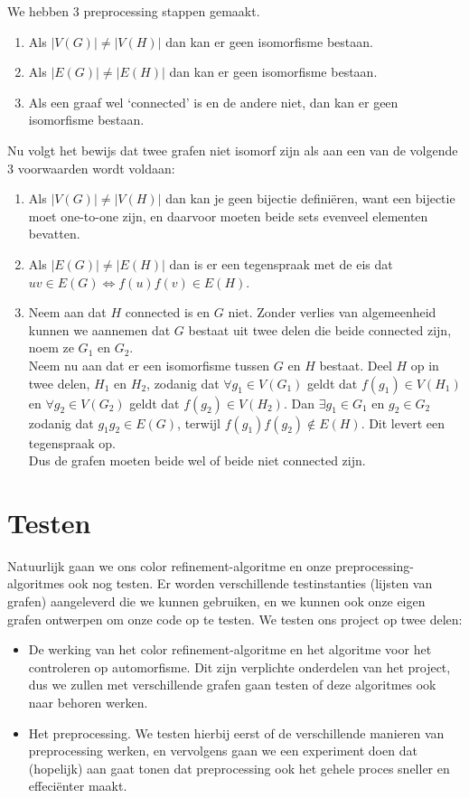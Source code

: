\documentclass{article}
\begin{document}
We hebben 3 preprocessing stappen gemaakt.
\begin{enumerate}
\item Als $|V(G)|\neq|V(H)|$ dan kan er geen isomorfisme bestaan.
\item Als $|E(G)|\neq|E(H)|$ dan kan er geen isomorfisme bestaan.
\item Als een graaf wel `connected' is en de andere niet, dan kan er geen isomorfisme bestaan.
\end{enumerate}
Nu volgt het bewijs dat twee grafen niet isomorf zijn als aan een van de volgende 3 voorwaarden wordt voldaan:
\begin{enumerate}
\item Als $|V(G)|\neq|V(H)|$ dan kan je geen bijectie defini\"eren, want een bijectie moet one-to-one zijn, en daarvoor moeten beide sets evenveel elementen bevatten.
\item Als $|E(G)|\neq|E(H)|$ dan is er een tegenspraak met de eis dat $uv\in E(G)\Leftrightarrow f(u)f(v)\in E(H)$.
\item Neem aan dat $H$ connected is en $G$ niet. Zonder verlies van algemeenheid kunnen we aannemen dat $G$ bestaat uit twee delen die beide connected zijn, noem ze $G_1$ en $G_2$.\\
Neem nu aan dat er een isomorfisme tussen $G$ en $H$ bestaat. Deel $H$ op in twee delen, $H_1$ en $H_2$, zodanig dat $\forall g_1\in V(G_1)$ geldt dat $f(g_1)\in V(H_1)$ en $\forall g_2\in V(G_2)$ geldt dat $f(g_2)\in V(H_2)$.
Dan $\exists g_1\in G_1$ en $g_2\in G_2$ zodanig dat $g_1g_2\in E(G)$, terwijl $f(g_1)f(g_2)\notin E(H)$. Dit levert een tegenspraak op.\\
Dus de grafen moeten beide wel of beide niet connected zijn.
\end{enumerate}

\pagebreak


\section{Testen}
Natuurlijk gaan we ons color refinement-algoritme en onze preprocessing-algoritmes ook nog testen. Er worden verschillende testinstanties (lijsten van grafen) aangeleverd die we kunnen gebruiken, en we kunnen ook onze eigen grafen ontwerpen om onze code op te testen. We testen ons project op twee delen:
\begin{itemize}
\item De werking van het color refinement-algoritme en het algoritme voor het controleren op automorfisme. Dit zijn verplichte onderdelen van het project, dus we zullen met verschillende grafen gaan testen of deze algoritmes ook naar behoren werken.
\item Het preprocessing. We testen hierbij eerst of de verschillende manieren van preprocessing werken, en vervolgens gaan we een experiment doen dat (hopelijk) aan gaat tonen dat preprocessing ook het gehele proces sneller en effeci\"enter maakt.
\end{itemize}
\pagebreak
\end{document}
